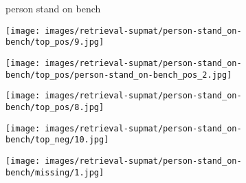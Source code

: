 \documentclass[10pt,twocolumn,letterpaper]{article}
\begin{document}
\begin{figure*}[t]
  
	\begin{minipage}[b]{0.005\textwidth}
    	\centering
    	\begin{turn}{90}
    	\small{{\color{blue}person} stand on {\color{red}bench}}
    	\end{turn}	
    \vspace{-3.5ex}
    \end{minipage}
    \hspace{0.01\textwidth}
    \begin{minipage}[t]{0.18\textwidth}
    	\centering
       	\texttt{[image: images/retrieval-supmat/person-stand\_on-bench/top\_pos/9.jpg]}\\
       	\vspace{1.5ex}
    \end{minipage}
    \hspace{0.005\textwidth}  
    \begin{minipage}[t]{0.18\textwidth}
    	\centering
       	\texttt{[image: images/retrieval-supmat/person-stand\_on-bench/top\_pos/person-stand\_on-bench\_pos\_2.jpg]}\\
       	\vspace{1.5ex}
    \end{minipage}
    \hspace{0.005\textwidth}
    \begin{minipage}[t]{0.18\textwidth}
       \centering
       \texttt{[image: images/retrieval-supmat/person-stand\_on-bench/top\_pos/8.jpg]}\\
       \vspace{1.5ex}
    \end{minipage}
    \hspace{0.005\textwidth}
    \begin{minipage}[t]{0.18\textwidth}
    	\centering
       	\texttt{[image: images/retrieval-supmat/person-stand\_on-bench/top\_neg/10.jpg]}\\
      	\vspace{1.5ex}
    \end{minipage} 
    \hspace{0.005\textwidth}
    \begin{minipage}[t]{0.18\textwidth}
    	\centering
       	\texttt{[image: images/retrieval-supmat/person-stand\_on-bench/missing/1.jpg]}\\
       	\vspace{1.5ex}
    \end{minipage}
     

\end{figure*}
\end{document}
